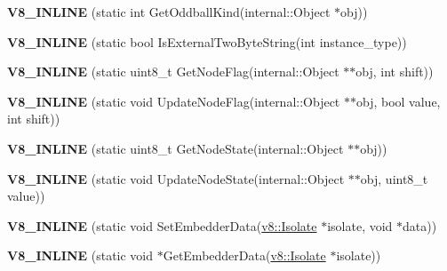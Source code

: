 \begin{DoxyCompactItemize}
\item 
\hypertarget{classv8_1_1internal_1_1_internals_af5f5ae125fa4e6e8a9465a70cda31ae3}{}{\bfseries V8\+\_\+\+I\+N\+L\+I\+N\+E} (static int Get\+Oddball\+Kind(internal\+::\+Object $\ast$obj))\label{classv8_1_1internal_1_1_internals_af5f5ae125fa4e6e8a9465a70cda31ae3}

\item 
\hypertarget{classv8_1_1internal_1_1_internals_a8669706ae5c335380476712690905e3c}{}{\bfseries V8\+\_\+\+I\+N\+L\+I\+N\+E} (static bool Is\+External\+Two\+Byte\+String(int instance\+\_\+type))\label{classv8_1_1internal_1_1_internals_a8669706ae5c335380476712690905e3c}

\item 
\hypertarget{classv8_1_1internal_1_1_internals_acc75beba18c48011d4f64f08cd590812}{}{\bfseries V8\+\_\+\+I\+N\+L\+I\+N\+E} (static uint8\+\_\+t Get\+Node\+Flag(internal\+::\+Object $\ast$$\ast$obj, int shift))\label{classv8_1_1internal_1_1_internals_acc75beba18c48011d4f64f08cd590812}

\item 
\hypertarget{classv8_1_1internal_1_1_internals_abd298c1791d3e9373a814deb9c717f62}{}{\bfseries V8\+\_\+\+I\+N\+L\+I\+N\+E} (static void Update\+Node\+Flag(internal\+::\+Object $\ast$$\ast$obj, bool value, int shift))\label{classv8_1_1internal_1_1_internals_abd298c1791d3e9373a814deb9c717f62}

\item 
\hypertarget{classv8_1_1internal_1_1_internals_a98601669f2eada958867d2d6dd036bbb}{}{\bfseries V8\+\_\+\+I\+N\+L\+I\+N\+E} (static uint8\+\_\+t Get\+Node\+State(internal\+::\+Object $\ast$$\ast$obj))\label{classv8_1_1internal_1_1_internals_a98601669f2eada958867d2d6dd036bbb}

\item 
\hypertarget{classv8_1_1internal_1_1_internals_a8d572dfc7c7b714ed08e9b0a5985dae0}{}{\bfseries V8\+\_\+\+I\+N\+L\+I\+N\+E} (static void Update\+Node\+State(internal\+::\+Object $\ast$$\ast$obj, uint8\+\_\+t value))\label{classv8_1_1internal_1_1_internals_a8d572dfc7c7b714ed08e9b0a5985dae0}

\item 
\hypertarget{classv8_1_1internal_1_1_internals_ac6230ed520366326b168af58dc10dbd3}{}{\bfseries V8\+\_\+\+I\+N\+L\+I\+N\+E} (static void Set\+Embedder\+Data(\hyperlink{classv8_1_1_isolate}{v8\+::\+Isolate} $\ast$isolate, void $\ast$data))\label{classv8_1_1internal_1_1_internals_ac6230ed520366326b168af58dc10dbd3}

\item 
\hypertarget{classv8_1_1internal_1_1_internals_acb49ba730133da0d6a473f199a29f2d8}{}{\bfseries V8\+\_\+\+I\+N\+L\+I\+N\+E} (static void $\ast$Get\+Embedder\+Data(\hyperlink{classv8_1_1_isolate}{v8\+::\+Isolate} $\ast$isolate))\label{classv8_1_1internal_1_1_internals_acb49ba730133da0d6a473f199a29f2d8}


\end{DoxyCompactItemize}

